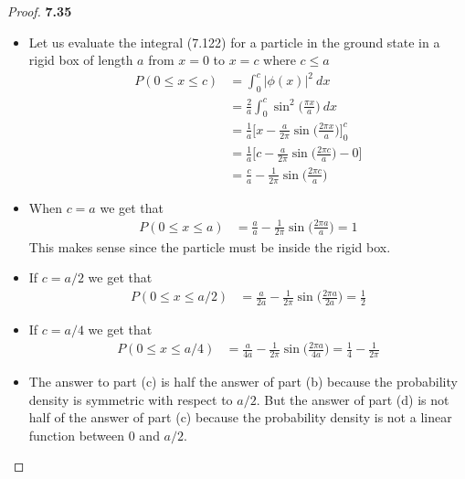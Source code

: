 \documentclass[11pt]{article}
\theoremstyle{definition}
\begin{document}
\cleardoublepage
\begin{proof}{\textbf{7.35}}
\begin{itemize}
\item [\textbf{(a)}] Let us evaluate the integral (7.122) for a particle in the
ground state in a rigid box of length $a$ from $x=0$ to $x=c$ where $c \leq a$
\begin{align*}
    P(0 \leq x \leq c) &= \int_0^c |\phi(x)|^2~dx\\
    &= \frac{2}{a} \int_0^c \sin^2\bigg(\frac{\pi x}{a}\bigg)~dx\\
    &= \frac{1}{a}\bigg[
    x - \frac{a}{2\pi}\sin\bigg(\frac{2\pi x}{a}\bigg)\bigg]_{0}^{c}\\
    &= \frac{1}{a}\bigg[
    c - \frac{a}{2\pi}\sin\bigg(\frac{2\pi c}{a}\bigg) - 0\bigg]\\
    &= \frac{c}{a} - \frac{1}{2\pi}\sin\bigg(\frac{2\pi c}{a}\bigg)
\end{align*}
\item [\textbf{(b)}] When $c = a$ we get that
\begin{align*}
    P(0 \leq x \leq a)
    &= \frac{a}{a} - \frac{1}{2\pi}\sin\bigg(\frac{2\pi a}{a}\bigg)
    = 1
\end{align*}
This makes sense since the particle must be inside the rigid box.
\item [\textbf{(c)}] If $c = a/2$ we get that
\begin{align*}
    P(0 \leq x \leq a/2)
    &= \frac{a}{2a} - \frac{1}{2\pi}\sin\bigg(\frac{2\pi a}{2a}\bigg)
    = \frac{1}{2}
\end{align*}
\item [\textbf{(d)}] If $c = a/4$ we get that
\begin{align*}
    P(0 \leq x \leq a/4)
    &= \frac{a}{4a} - \frac{1}{2\pi}\sin\bigg(\frac{2\pi a}{4a}\bigg)
    = \frac{1}{4} - \frac{1}{2\pi}
\end{align*}
\item [\textbf{(e)}] The answer to part (c) is half the answer of part (b)
because the probability density is symmetric with respect to $a/2$.
But the answer of part (d) is not half of the answer of part (c) because the
probability density is not a linear function between $0$ and $a/2$.
\end{itemize}
\end{proof}
\end{document}
